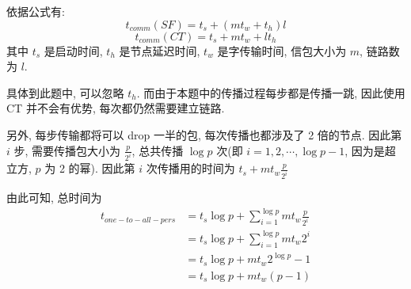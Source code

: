 \documentclass[UTF8]{article}
\begin{document}
依据公式有:
$$t_{comm}(SF)=t_s+(mt_w+t_h)l$$
$$t_{comm}(CT)=t_s+mt_w+lt_h$$
其中 $t_s$ 是启动时间, $t_h$ 是节点延迟时间, $t_w$ 是字传输时间, 信包大小为 $m$, 链路数为 $l$.

具体到此题中, 可以忽略 $t_h$. 而由于本题中的传播过程每步都是传播一跳, 因此使用 CT 并不会有优势, 每次都仍然需要建立链路. 

另外, 每步传输都将可以 drop 一半的包, 每次传播也都涉及了 2 倍的节点. 因此第 $i$ 步, 需要传播包大小为 $\frac{p}{2^i}$, 总共传播 $\log p$ 次(即 $i=1, 2, \cdots, \log p - 1$, 因为是超立方, $p$ 为 2 的幂). 因此第 $i$ 次传播用的时间为 $t_s + mt_w\frac{p}{2^i}$

由此可知, 总时间为 
\begin{align*}
	t_{one-to-all-pers}&=t_s\log p + \sum\limits_{i=1}^{\log p} mt_w\frac{p}{2^i} \\
	&=t_s\log p + \sum\limits_{i=1}^{\log p} mt_w{2^i}\\
	&=t_s\log p + mt_w2^{\log p}-1 \\
	&=t_s\log p+mt_w(p-1)
\end{align*}
\end{document}
